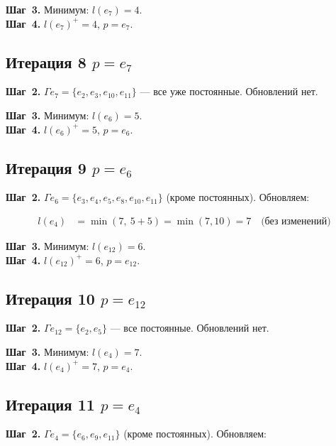 \documentclass[a4paper,12pt]{article}
\begin{document}
\textbf{Шаг~3.} Минимум: $l(e_7) = 4$.\\
\textbf{Шаг~4.} $l(e_7)^+ = 4$, $p = e_7$.

\subsection*{Итерация 8 \hspace{1em} $p = e_7$}

\textbf{Шаг~2.} $\Gamma e_7 = \{e_2, e_3, e_{10}, e_{11}\}$ --- все уже постоянные. Обновлений нет.

\textbf{Шаг~3.} Минимум: $l(e_6) = 5$.\\
\textbf{Шаг~4.} $l(e_6)^+ = 5$, $p = e_6$.

\subsection*{Итерация 9 \hspace{1em} $p = e_6$}

\textbf{Шаг~2.} $\Gamma e_6 = \{e_3, e_4, e_5, e_8, e_{10}, e_{11}\}$ (кроме постоянных). Обновляем:

\begin{align*}
	l(e_4) & = \min(7,\ 5+5) = \min(7,10) = 7 \quad \text{(без изменений)}
\end{align*}

\textbf{Шаг~3.} Минимум: $l(e_{12}) = 6$.\\
\textbf{Шаг~4.} $l(e_{12})^+ = 6$, $p = e_{12}$.

\subsection*{Итерация 10 \hspace{1em} $p = e_{12}$}

\textbf{Шаг~2.} $\Gamma e_{12} = \{e_2, e_5\}$ --- все постоянные. Обновлений нет.

\textbf{Шаг~3.} Минимум: $l(e_4) = 7$.\\
\textbf{Шаг~4.} $l(e_4)^+ = 7$, $p = e_4$.

\subsection*{Итерация 11 \hspace{1em} $p = e_4$}

\textbf{Шаг~2.} $\Gamma e_4 = \{e_6, e_9, e_{11}\}$ (кроме постоянных). Обновляем:
\end{document}
